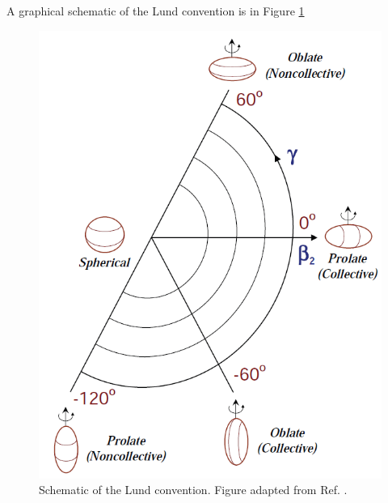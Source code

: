 A graphical schematic of the Lund convention is in Figure \ref{fig:chp2-lund}
\begin{figure}[t!]
\centerline{\includegraphics[height=0.25\textheight]{./img/c2/lundconv.png}}
	\caption{Schematic of the Lund convention. Figure adapted from Ref. \cite{danielDissertation}.\label{fig:chp2-lund}}
\end{figure}

